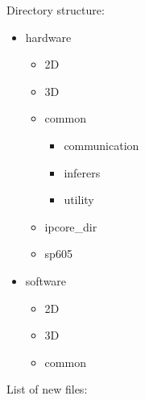 Directory structure:

\begin{itemize}
    \item hardware
    \begin{itemize}
        \item 2D
        \item 3D
        \item common
        \begin{itemize}
            \item communication
            \item inferers
            \item utility
        \end{itemize}
        \item ipcore\_dir
        \item sp605
    \end{itemize}
    \item software
    \begin{itemize}
        \item 2D
        \item 3D
        \item common
    \end{itemize}
\end{itemize}

List of new files:

